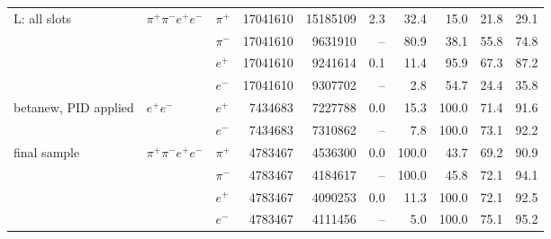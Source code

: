 \begin{table}[H]
\begin{tabular}{@{}l l l r r r r r r r@{}}
\midrule
L: all slots & $\pi^+\pi^-e^+e^-$ & $\pi^+$ & 17041610 & 15185109 & 2.3 & 32.4 & 15.0 & 21.8 & 29.1 \\
 &  & $\pi^-$ & 17041610 & 9631910 & -- & 80.9 & 38.1 & 55.8 & 74.8 \\
 &  & $e^+$ & 17041610 & 9241614 & 0.1 & 11.4 & 95.9 & 67.3 & 87.2 \\
 &  & $e^-$ & 17041610 & 9307702 & -- & 2.8 & 54.7 & 24.4 & 35.8 \\
\midrule
betanew, PID applied & $e^+e^-$ & $e^+$ & 7434683 & 7227788 & 0.0 & 15.3 & 100.0 & 71.4 & 91.6 \\
 &  & $e^-$ & 7434683 & 7310862 & -- & 7.8 & 100.0 & 73.1 & 92.2 \\
\midrule
final sample & $\pi^+\pi^-e^+e^-$ & $\pi^+$ & 4783467 & 4536300 & 0.0 & 100.0 & 43.7 & 69.2 & 90.9 \\
 &  & $\pi^-$ & 4783467 & 4184617 & -- & 100.0 & 45.8 & 72.1 & 94.1 \\
 &  & $e^+$ & 4783467 & 4090253 & 0.0 & 11.3 & 100.0 & 72.1 & 92.5 \\
 &  & $e^-$ & 4783467 & 4111456 & -- & 5.0 & 100.0 & 75.1 & 95.2 \\
\bottomrule
\end{tabular}
\end{table}
